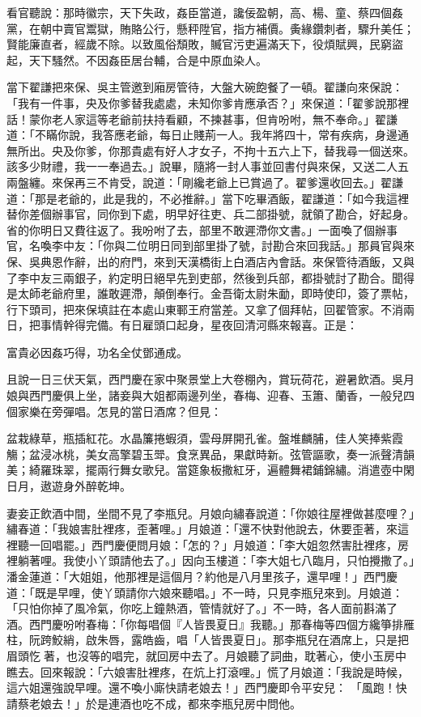 看官聽說：那時徽宗，天下失政，姦臣當道，讒佞盈朝，高、楊、童、蔡四個姦黨，在朝中賣官鬻獄，賄賂公行，懸秤陞官，指方補價。夤緣鑽刺者，驟升美任；賢能廉直者，經歲不除。以致風俗頹敗，贓官污吏遍滿天下，役煩賦興，民窮盜起，天下騷然。不因姦臣居台輔，合是中原血染人。

當下翟謙把來保、吳主管邀到廂房管待，大盤大碗飽餐了一頓。翟謙向來保說：「我有一件事，央及你爹替我處處，未知你爹肯應承否？」來保道：「翟爹說那裡話！蒙你老人家這等老爺前扶持看顧，不揀甚事，但肯吩咐，無不奉命。」翟謙道：「不瞞你說，我答應老爺，每日止賤荊一人。我年將四十，常有疾病，身邊通無所出。央及你爹，你那貴處有好人才女子，不拘十五六上下，替我尋一個送來。該多少財禮，我一一奉過去。」說畢，隨將一封人事並回書付與來保，又送二人五兩盤纏。來保再三不肯受，說道：「剛纔老爺上已賞過了。翟爹還收回去。」翟謙道：「那是老爺的，此是我的，不必推辭。」當下吃畢酒飯，翟謙道：「如今我這裡替你差個辦事官，同你到下處，明早好往吏、兵二部掛號，就領了勘合，好起身。省的你明日又費往返了。我吩咐了去，部里不敢遲滯你文書。」一面喚了個辦事官，名喚李中友：「你與二位明日同到部里掛了號，討勘合來回我話。」那員官與來保、吳典恩作辭，出的府門，來到天漢橋街上白酒店內會話。來保管待酒飯，又與了李中友三兩銀子，約定明日絕早先到吏部，然後到兵部，都掛號討了勘合。聞得是太師老爺府里，誰敢遲滯，顛倒奉行。金吾衛太尉朱勔，即時使印，簽了票帖，行下頭司，把來保填註在本處山東鄆王府當差。又拿了個拜帖，回翟管家。不消兩日，把事情幹得完備。有日雇頭口起身，星夜回清河縣來報喜。正是：

富貴必因姦巧得，功名全仗鄧通成。

且說一日三伏天氣，西門慶在家中聚景堂上大卷棚內，賞玩荷花，避暑飲酒。吳月娘與西門慶俱上坐，諸妾與大姐都兩邊列坐，春梅、迎春、玉簫、蘭香，一般兒四個家樂在旁彈唱。怎見的當日酒席？但見：

盆栽綠草，瓶插紅花。水晶簾捲蝦須，雲母屏開孔雀。盤堆麟脯，佳人笑捧紫霞觴；盆浸冰桃，美女高擎碧玉斝。食烹異品，果獻時新。弦管謳歌，奏一派聲清韻美；綺羅珠翠，擺兩行舞女歌兒。當筵象板撒紅牙，遍體舞裙鋪錦繡。消遣壺中閑日月，遨遊身外醉乾坤。

妻妾正飲酒中間，坐間不見了李瓶兒。月娘向繡春說道：「你娘往屋裡做甚麼哩？」繡春道：「我娘害肚裡疼，歪著哩。」月娘道：「還不快對他說去，休要歪著，來這裡聽一回唱罷。」西門慶便問月娘：「怎的？」月娘道：「李大姐忽然害肚裡疼，房裡躺著哩。我使小丫頭請他去了。」因向玉樓道：「李大姐七八臨月，只怕攪撒了。」潘金蓮道：「大姐姐，他那裡是這個月？約他是八月里孩子，還早哩！」西門慶道：「既是早哩，使丫頭請你六娘來聽唱。」不一時，只見李瓶兒來到。月娘道：「只怕你掉了風冷氣，你吃上鐘熱酒，管情就好了。」不一時，各人面前斟滿了酒。西門慶吩咐春梅：「你每唱個『人皆畏夏日』我聽。」那春梅等四個方纔箏排雁柱，阮跨鮫綃，啟朱唇，露皓齒，唱「人皆畏夏日」。那李瓶兒在酒席上，只是把眉頭忔著，也沒等的唱完，就回房中去了。月娘聽了詞曲，耽著心，使小玉房中瞧去。回來報說：「六娘害肚裡疼，在炕上打滾哩。」慌了月娘道：「我說是時候，這六姐還強說早哩。還不喚小廝快請老娘去！」西門慶即令平安兒： 「風跑！快請蔡老娘去！」於是連酒也吃不成，都來李瓶兒房中問他。

